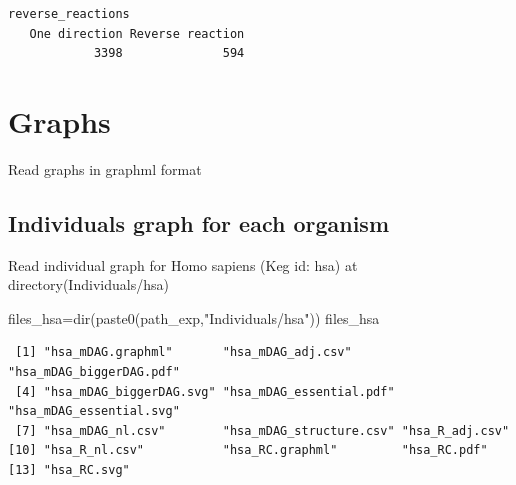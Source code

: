 \documentclass[
  letterpaper,
  DIV=11,
  numbers=noendperiod]{scrreprt}
\newenvironment{Shaded}{}{}
\newcommand{\DecValTok}[1]{\textcolor[rgb]{0.82,0.60,0.40}{#1}}
\newcommand{\FunctionTok}[1]{\textcolor[rgb]{0.38,0.69,0.94}{#1}}
\newcommand{\NormalTok}[1]{\textcolor[rgb]{0.67,0.70,0.75}{#1}}
\newcommand{\OtherTok}[1]{\textcolor[rgb]{0.15,0.68,0.38}{#1}}
\newcommand{\SpecialCharTok}[1]{\textcolor[rgb]{0.34,0.71,0.76}{#1}}
\newcommand{\StringTok}[1]{\textcolor[rgb]{0.60,0.76,0.47}{#1}}
\begin{document}
\begin{Shaded}
\end{Shaded}

\begin{verbatim}
reverse_reactions
   One direction Reverse reaction 
            3398              594 
\end{verbatim}


\hypertarget{graphs}{%
\chapter{Graphs}\label{graphs}}

Read graphs in graphml format

\hypertarget{individuals-graph-for-each-organism}{%
\section{Individuals graph for each
organism}\label{individuals-graph-for-each-organism}}

Read individual graph for Homo sapiens (Keg id: hsa) at
directory(Individuals/hsa)

\begin{Shaded}
\begin{Highlighting}[]
\NormalTok{files\_hsa}\OtherTok{=}\FunctionTok{dir}\NormalTok{(}\FunctionTok{paste0}\NormalTok{(path\_exp,}\StringTok{"Individuals/hsa"}\NormalTok{))}
\NormalTok{files\_hsa}
\end{Highlighting}
\end{Shaded}

\begin{verbatim}
 [1] "hsa_mDAG.graphml"       "hsa_mDAG_adj.csv"       "hsa_mDAG_biggerDAG.pdf"
 [4] "hsa_mDAG_biggerDAG.svg" "hsa_mDAG_essential.pdf" "hsa_mDAG_essential.svg"
 [7] "hsa_mDAG_nl.csv"        "hsa_mDAG_structure.csv" "hsa_R_adj.csv"         
[10] "hsa_R_nl.csv"           "hsa_RC.graphml"         "hsa_RC.pdf"            
[13] "hsa_RC.svg"            
\end{verbatim}
\end{document}
